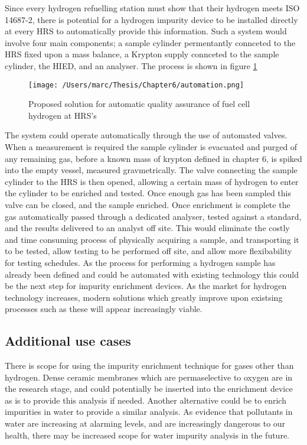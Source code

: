 Since every hydrogen refuelling station must show that their hydrogen meets ISO 14687-2, there is potential for a hydrogen impurity device to be installed directly at every HRS to automatically provide this information. Such a system would involve four main components; a sample cylinder permentantly connceted to the HRS fixed upon a mass balance, a Krypton supply connceted to the sample cylinder, the HIED, and an analyser. The process is shown in figure \ref{autoprocedure}


\begin{figure}
    \centering
    \texttt{[image: /Users/marc/Thesis/Chapter6/automation.png]}
    \caption{Proposed solution for automatic quality assurance of fuel cell hydrogen at HRS's}
    \label{autoprocedure}
\end{figure}

The system could operate automatically through the use of automated valves. When a measurement is required the sample cylinder is evacuated and purged of any remaining gas, before a known mass of krypton defined in chapter 6, is spiked into the empty vessel, measured gravmetrically. The valve connecting the sample cylinder to the HRS is then opened, allowing a certain mass of hydrogen to enter the cylinder to be enriched and tested. Once enough gas has been sampled this valve can be closed, and the sample enriched. Once enrichment is complete the gas automatically passed through a dedicated analyser, tested against a standard, and the results delivered to an analyst off site. This would eliminate the costly and time consuming process of physically acquiring a sample, and transporting it to be tested, allow testing to be performed off site, and allow more flexibability for testing schedules. As the process for performing a hydrogen sample has already been defined \cite{BACQUART20205565} and could be automated with existing technology this could be the next step for impurity enrichment devices. As the market for hydrogen technology increases, modern solutions which greatly improve upon existsing processes such as these will appear increasingly viable.

\subsection{Additional use cases}
There is scope for using the impurity enrichment technique for gases other than hydrogen. Dense ceramic membranes which are permaselective to oxygen are in the research stage, \cite{LIU2005103} and could potentially be inserted into the enrichment device as is to provide this analysis if needed. Another alternative could be to enrich impurities in water to provide a similar analysis. As evidence that pollutants in water are increasing at alarming levels, and are increasingly dangerous to our health, there may be increased scope for water impurity analysis in the future. \cite{marketresearchfirm}

